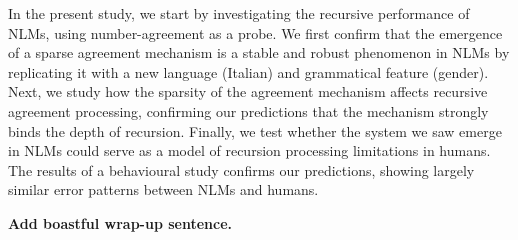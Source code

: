 In the present study, we start by investigating the recursive
performance of NLMs, using number-agreement as a
probe. %
We first confirm that the emergence of a sparse agreement mechanism is
a stable and robust phenomenon in NLMs by replicating it with a new
language (Italian) and grammatical feature (gender). Next, we study
how the sparsity of the agreement mechanism affects recursive
agreement processing, confirming our predictions that the mechanism
strongly binds the depth of recursion. Finally, we test whether the
 system we saw emerge in NLMs could serve as a
model of recursion processing limitations in humans. The results of a
behavioural study confirms our predictions, showing largely similar
error patterns between NLMs and humans.

\textbf{Add boastful wrap-up sentence.}


